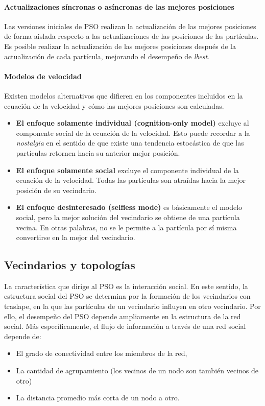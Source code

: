 \documentclass{article}
\begin{document}
\paragraph{Actualizaciones síncronas o asíncronas de las mejores posiciones}
Las versiones iniciales de PSO realizan la actualización de las mejores posiciones de forma aislada respecto a las actualizaciones de las posiciones de las partículas.
Es posible realizar la actualización de las mejores posiciones después de la actualización de cada partícula, mejorando el desempeño de \emph{lbest}.

\paragraph{Modelos de velocidad}
Existen modelos alternativos que difieren en los componentes incluidos en la ecuación de la velocidad y cómo las mejores posiciones son calculadas.
\begin{itemize}
	\item \textbf{El enfoque solamente individual (cognition-only model)} excluye al componente social de la ecuación de la velocidad.
	Esto puede recordar a la \emph{nostalgia} en el sentido de que existe una tendencia estocástica de que las partículas retornen hacia su anterior mejor posición.
	\item \textbf{El enfoque solamente social} excluye el componente individual de la ecuación de la velocidad.
	Todas las partículas son atraídas hacia la mejor posición de su vecindario.
	\item \textbf{El enfoque desinteresado (selfless mode)} es básicamente el modelo social, pero la mejor solución del vecindario se obtiene de una partícula vecina.
	En otras palabras, no se le permite a la partícula por sí misma convertirse en la mejor del vecindario.
\end{itemize}

\subsection{Vecindarios y topologías}
La característica que dirige al PSO es la interacción social.
En este sentido, la estructura social del PSO se determina por la formación de los vecindarios con traslape, en la que las partículas de un vecindario influyen en otro vecindario.
Por ello, el desempeño del PSO depende ampliamente en la estructura de la red social.
Más específicamente, el flujo de información a través de una red social depende de:
\begin{itemize}
	\item El grado de conectividad entre los miembros de la red,
	\item La cantidad de agrupamiento (los vecinos de un nodo son también vecinos de otro)
	\item La distancia promedio más corta de un nodo a otro.
\end{itemize}
\end{document}
